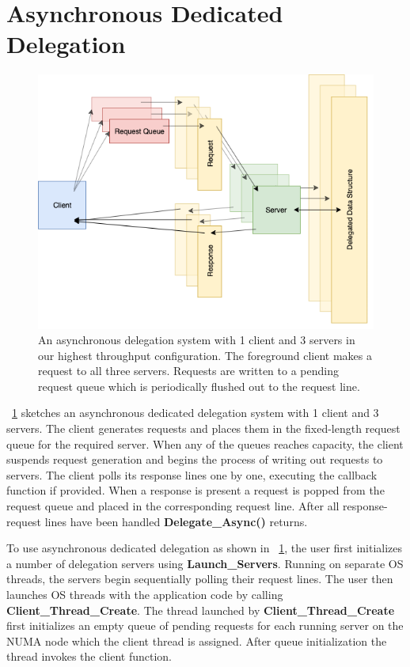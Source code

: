 \documentclass{uicthesi}
\begin{document}
\section{Asynchronous Dedicated Delegation}
\begin{figure}[ht!]
\centering
\includegraphics[width=0.9\columnwidth]{FIG/dedicated_async.png}
\caption{An asynchronous delegation system with 1 client and 3 servers in our highest throughput configuration. The foreground client makes a request to all three servers. Requests are written to a pending request queue which is periodically flushed out to the request line. }
\label{fig:dedicated_delegation}
\end{figure}

~\ref{fig:dedicated_delegation} sketches an asynchronous dedicated delegation system with 1 client and 3 servers. The client generates requests and places them in the fixed-length request queue for the required server. When any of the queues reaches capacity, the client suspends request generation and begins the process of writing out requests to servers. The client polls its response lines one by one, executing the callback function if provided. When a response is present a request is popped from the request queue and placed in the corresponding request line. After all response-request lines have been handled \textbf{Delegate\_Async()} returns. 

To use asynchronous dedicated delegation as shown in ~\ref{fig:dedicated_delegation}, the user first initializes a number of delegation servers using \textbf{Launch\_Servers}. Running on separate OS threads, the servers begin sequentially polling their request lines. The user then launches OS threads with the application code by calling \textbf{Client\_Thread\_Create}. The thread launched by \textbf{Client\_Thread\_Create} first initializes an empty queue of pending requests for each running server on the NUMA node which the client thread is assigned. After queue initialization the thread invokes the client function. 
\end{document}
